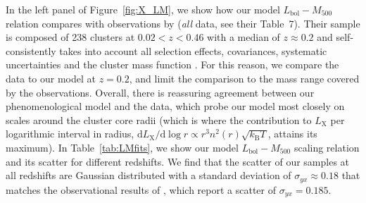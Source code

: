 \documentclass[traditabstract]{aa}
\newcommand{\rmn}{\mathrm}
\newcommand{\dd}{\mathrm{d}}
\begin{document}
In the left panel of Figure~\ref{fig:X_LM}, we show how our model
$L_{\rmn{bol}}-M_{500}$ relation compares with observations by
\cite{2010MNRAS.406.1773M} (\emph{all} data, see their Table~7). Their sample is
composed of 238 clusters at $0.02<z<0.46$ with a median of $z \approx 0.2$ and
self-consistently takes into account all selection effects, covariances,
systematic uncertainties and the cluster mass function \citep{2010MNRAS.406.1759M}. 
For this reason, we compare the \cite{2010MNRAS.406.1773M} data to our model at $z=0.2$, 
and limit the comparison to the mass range covered by the observations. Overall, there is
reassuring agreement between our phenomenological model and the data, which
probe our model most closely on scales around the cluster core radii (which is
where the contribution to $L_{\rmn{X}}$ per logarithmic interval in radius, $\dd
L_{\rmn{X}}/\dd\log r \propto r^3 n^2(r) \sqrt{k_{\rmn{B}}T}$, attains its maximum).  In
Table~\ref{tab:LMfits}, we show our model $L_{\rmn{bol}}-M_{500}$ scaling
relation and its scatter for different redshifts. We find that the scatter of
our samples at all redshifts are Gaussian distributed with a standard deviation
of $\sigma_{yx} \approx 0.18$ that matches the observational results of
\cite{2010MNRAS.406.1773M}, which report a scatter of $\sigma_{yx} = 0.185$.
\end{document}
